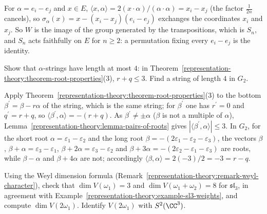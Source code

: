 \begin{solution}
For $\alpha = e_i - e_j$ and $x \in E$, $\langle x, \alpha\rangle = 2(x \cdot \alpha)/(\alpha \cdot \alpha) = x_i - x_j$ (the factor $\frac1{2n}$ cancels), so
$\sigma_\alpha(x) = x - (x_i - x_j)(e_i - e_j)$ exchanges the coordinates $x_i$ and $x_j$. So $W$ is the image of the group generated by the transpositions, which is $S_n$, and $S_n$ acts
faithfully on $E$ for $n \geq 2$: a permutation fixing every $e_i - e_j$ is the identity.
\end{solution}

\begin{exercise}\label{representation-theory:exercise-root-strings}
Show that $\alpha$-strings have length at most $4$: in Theorem~\ref{representation-theory:theorem-root-properties}(3), $r + q \leq 3$. Find a string of length $4$ in $G_2$.
\end{exercise}

\begin{solution}
Apply Theorem~\ref{representation-theory:theorem-root-properties}(3) to the bottom $\beta^{\prime} = \beta - r\alpha$ of the string, which is the same string; for $\beta^{\prime}$ one has
$r^{\prime} = 0$ and $q^{\prime} = r + q$, so $\langle\beta^{\prime}, \alpha\rangle = -(r + q)$. As $\beta^{\prime} \neq \pm\alpha$ ($\beta$ is not a multiple of $\alpha$),
Lemma~\ref{representation-theory:lemma-pairs-of-roots} gives $|\langle\beta^{\prime}, \alpha\rangle| \leq 3$. In $G_2$, for the short root $\alpha = \varepsilon_1 - \varepsilon_2$ and the
long root $\beta = -(2\varepsilon_1 - \varepsilon_2 - \varepsilon_3)$, the vectors $\beta$, $\beta + \alpha = \varepsilon_3 - \varepsilon_1$, $\beta + 2\alpha = \varepsilon_3 - \varepsilon_2$ and
$\beta + 3\alpha = -(2\varepsilon_2 - \varepsilon_1 - \varepsilon_3)$ are roots, while $\beta - \alpha$ and $\beta + 4\alpha$ are not; accordingly
$\langle\beta, \alpha\rangle = 2(-3)/2 = -3 = r - q$.
\end{solution}

\begin{exercise}\label{representation-theory:exercise-sl3-dimension}
Using the Weyl dimension formula (Remark~\ref{representation-theory:remark-weyl-character}), check that $\dim V(\omega_1) = 3$ and $\dim V(\omega_1 + \omega_2) = 8$ for $\mathfrak{sl}_3$, in
agreement with Example~\ref{representation-theory:example-sl3-weights}, and compute $\dim V(2\omega_1)$. Identify $V(2\omega_1)$ with $S^2(\CC^3)$.
\end{exercise}

